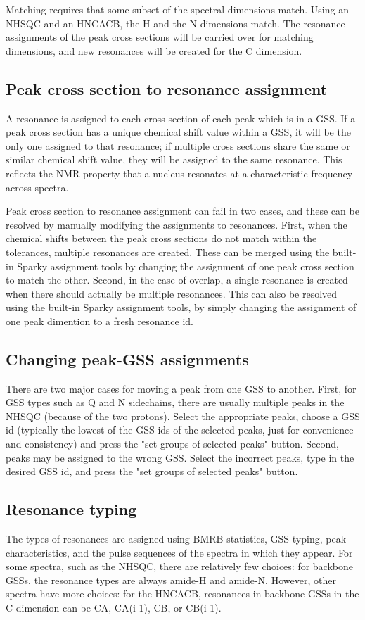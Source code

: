 Matching requires that some subset of the spectral dimensions match.  Using
an NHSQC and an HNCACB, the H and the N dimensions match.  The resonance
assignments of the peak cross sections will be carried over for matching dimensions,
and new resonances will be created for the C dimension.

\subsection*{Peak cross section to resonance assignment}
A resonance is assigned to each cross section of each peak which is in a GSS.
If a peak cross section has a unique chemical shift value within a GSS, it will
be the only one assigned to that resonance; if multiple cross sections share 
the same or similar chemical shift value, they will be assigned to the same
resonance.  This reflects the NMR property that a nucleus resonates
at a characteristic frequency across spectra.

Peak cross section to resonance assignment can fail in two cases, and these
can be resolved by manually modifying the assignments to resonances.
First, when the chemical shifts between the peak cross sections do not match
within the tolerances, multiple resonances are created.  These can be merged
using the built-in Sparky assignment tools by changing the assignment of one
peak cross section to match the other.
Second, in the case of overlap, a single resonance is created when there
should actually be multiple resonances.  This can also be resolved using 
the built-in Sparky assignment tools, by simply changing the assignment of
one peak dimention to a fresh resonance id.

\subsection*{Changing peak-GSS assignments}
There are two major cases for moving a peak from one GSS to another.
First, for GSS types such as Q and N sidechains, there are usually multiple
peaks in the NHSQC (because of the two protons).  Select the appropriate
peaks, choose a GSS id (typically the lowest of the GSS ids of the selected
peaks, just for convenience and consistency) and press the "set groups of
selected peaks" button.
Second, peaks may be assigned to the wrong GSS.  Select the incorrect peaks,
type in the desired GSS id, and press the "set groups of selected peaks" button.

\subsection*{Resonance typing}
The types of resonances are assigned using BMRB statistics, GSS typing, 
peak characteristics,
and the pulse sequences of the spectra in which they appear.  For some spectra,
such as the NHSQC, there are relatively few choices: for backbone GSSs,
the resonance types are always amide-H and amide-N.  However, other spectra
have more choices: for the HNCACB, resonances in backbone GSSs in the C
dimension can be CA, CA(i-1), CB, or CB(i-1).

